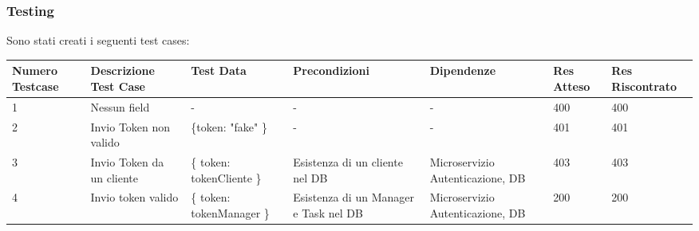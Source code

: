 \documentclass{report}
\begin{document}
\subsubsection*{Testing}

Sono stati creati i seguenti test cases:
\begin{center} %
	\centering
	\begin{tabular}{ |p{1cm}|p{2cm}|p{2cm}|p{2cm}|p{2cm}|p{1cm}|p{1cm}| }
		\hline
		Numero Testcase & Descrizione Test Case     & Test Data                 & Precondizioni                         & Dipendenze                       & Res Atteso & Res Riscontrato \\
		\hline
		1               & Nessun field              & -                         & -                                     & -                                & 400        & 400             \\
		\hline
		2               & Invio Token non valido    & \{token: "fake" \}        & -                                     & -                                & 401        & 401             \\
		\hline
		3               & Invio Token da un cliente & \{ token: tokenCliente \} & Esistenza di un cliente nel DB        & Microservizio Autenticazione, DB & 403        & 403             \\
		\hline
		4               & Invio token valido        & \{ token: tokenManager \} & Esistenza di un Manager e Task nel DB & Microservizio Autenticazione, DB & 200        & 200             \\
		\hline
	\end{tabular}
\end{center}
\end{document}
